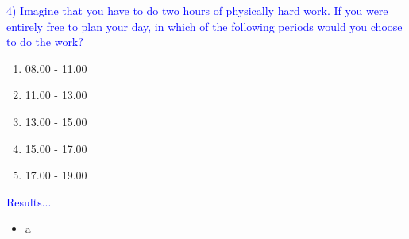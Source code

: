 \documentclass[landscape]{slides}
\begin{document}
\begin{slide}

    \textcolor{blue}{\Large{4) Imagine that you have to do two hours of physically hard work. If you were entirely free to plan your day, in which of the following periods would you choose to do the work?}}

    \begin{enumerate}
        \item 08.00 - 11.00
        \item 11.00 - 13.00
        \item 13.00 - 15.00
        \item 15.00 - 17.00
        \item 17.00 - 19.00
    \end{enumerate}

\end{slide}



\begin{slide}

    \textcolor{blue}{\Large{Results...}}

    \begin{itemize}
        \item a
    \end{itemize}

\end{slide}
\end{document}
